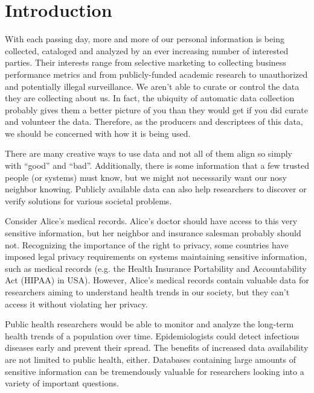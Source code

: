\documentclass[12pt]{report}
\begin{document}
\clearpage
\tableofcontents
\clearpage
\listoffigures
\clearpage

\chapter{Introduction}\label{sec:introduction}

With each passing day, more and more of our personal information is being collected, cataloged and analyzed by an ever increasing number of interested parties.
Their interests range from selective marketing to collecting business performance metrics and from publicly-funded academic research to unauthorized and potentially illegal surveillance.
We aren't able to curate or control the data they are collecting about us.
In fact, the ubiquity of automatic data collection probably gives them a better picture of you than they would get if you did curate and volunteer the data.
Therefore, as the producers and descriptees of this data, we should be concerned with how it is being used.

There are many creative ways to use data and not all of them align so simply with ``good'' and ``bad''.
Additionally, there is some information that a few trusted people (or systems) must know, but we might not necessarily want our nosy neighbor knowing.
Publicly available data can also help researchers to discover or verify solutions for various societal problems.

Consider Alice's medical records.
Alice's doctor should have access to this very sensitive information, but her neighbor and insurance salesman probably should not.
Recognizing the importance of the right to privacy, some countries have imposed legal privacy requirements on systems maintaining sensitive information, such as medical records (e.g. the Health Insurance Portability and Accountability Act (HIPAA) in USA).
However, Alice's medical records contain valuable data for researchers aiming to understand health trends in our society, but they can't access it without violating her privacy.

Public health researchers would be able to monitor and analyze the long-term health trends of a population over time.
Epidemiologists could detect infectious diseases early and prevent their spread.
The benefits of increased data availability are not limited to public health, either.
Databases containing large amounts of sensitive information can be tremendously valuable for researchers looking into a variety of important questions.
\end{document}
